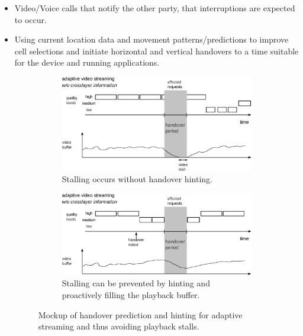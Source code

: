 \begin{itemize}
	\item Video/Voice calls that notify the other party, that interruptions are expected to occur.

	\item Using current location data and movement patterns/predictions to improve cell selections and initiate horizontal and vertical handovers to a time suitable for the device and running applications.

	\begin{figure}[htb]
	        \centering
	        \begin{subfigure}[b]{0.90\textwidth}
	            \centering
				\includegraphics[width=\textwidth]{images/adaptive-streaming-no-cl.pdf}
				\caption{Stalling occurs without handover hinting.}
				\label{c5:fig:streaming-hinting-no-cl}
	        \end{subfigure}%

	        \begin{subfigure}[b]{0.90\textwidth}
				\centering
				\includegraphics[width=\textwidth]{images/adaptive-streaming-cl.pdf}
				\caption{Stalling can be prevented by hinting and proactively filling the playback buffer.}
				\label{c5:fig:streaming-hinting-cl}
			   \end{subfigure}%
	 \caption{Mockup of handover prediction and hinting for adaptive streaming and thus avoiding playback stalls.}
	\label{c5:fig:streaming-hinting}
	\end{figure}


\end{itemize}
